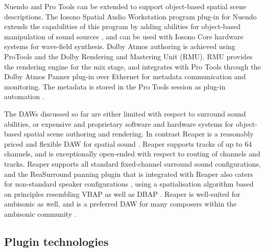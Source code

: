 \documentclass{article}
\begin{document}
Nuendo and Pro Tools can be extended to support object-based spatial scene descriptions.
The Iosono Spatial Audio Workstation program plug-in for Nuendo extends the capabilities of this program by adding abilities for object-based manipulation of sound sources \cite{iosono2012:workstation}, and can be used with Iosono Core hardware systems for wave-field synthesis.
Dolby Atmos authoring is achieved using ProTools and the Dolby Rendering and Mastering Unit (RMU).
RMU provides the rendering engine for the mix stage, and integrates with Pro Tools through the Dolby Atmos Panner plug-in over Ethernet for metadata communication and monitoring. 
The metadata is stored in the Pro Tools session as plug-in automation \cite{dolby:2013authoring}.

The DAWs discussed so far are either limited with respect to surround sound abilities, or expensive and proprietary software and hardware systems for object-based spatial scene authoring and rendering.
In contrast Reaper is a reasonably priced and flexible DAW for spatial sound \cite{cockos:2014reaper}.
Reaper supports tracks of up to 64 channels, and is exceptionally open-ended with respect to routing of channels and tracks.
Reaper supports all standard fixed-channel surround sound configurations, and the ReaSurround panning plugin that is integrated with Reaper also caters for non-standard speaker configurations \cite{francis:2014_reaper}, using a spatialisation algorithm based on principles resembling VBAP \cite{Pulkki:1997vbap} as well as DBAP \cite{Lossius:2009dbap}.
Reaper is well-suited for ambisonic as well, and is a preferred DAW for many composers within the ambisonic  community \cite{wiggins:2012reaperhowto}.





\subsection{Plugin technologies}\label{sec:plugin-technologies}
\end{document}
